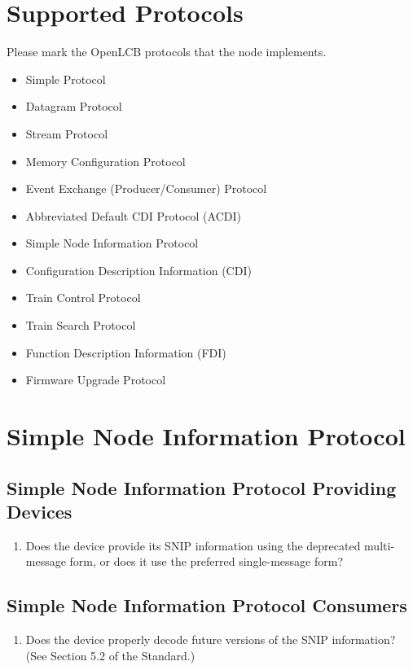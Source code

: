 \section{Supported Protocols}
    Please mark the OpenLCB protocols that the node implements.
    \begin{itemize}
        \item[$\square$] Simple Protocol
        \item[$\square$] Datagram Protocol
        \item[$\square$] Stream Protocol
        \item[$\square$] Memory Configuration Protocol
        \item[$\square$] Event Exchange (Producer/Consumer) Protocol
        \item[$\square$] Abbreviated Default CDI Protocol (ACDI)
        \item[$\square$] Simple Node Information Protocol 
        \item[$\square$] Configuration Description Information (CDI) 
        \item[$\square$] Train Control Protocol 
        \item[$\square$] Train Search Protocol 
        \item[$\square$] Function Description Information (FDI) 
        \item[$\square$] Firmware Upgrade Protocol 
    \end{itemize}

\section{Simple Node Information Protocol}
    \subsection{Simple Node Information Protocol Providing Devices}
        \begin{enumerate}
            \item Does the device provide its SNIP information using
                the deprecated multi-message form, or does it use
                the preferred single-message form?
        \end{enumerate}
    \subsection{Simple Node Information Protocol Consumers}
        \begin{enumerate}
            \item Does the device properly decode future versions of the SNIP
                information? (See Section 5.2 of the Standard.)
        \end{enumerate}

